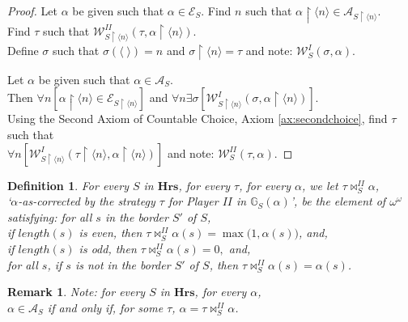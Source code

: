\documentclass[a4paper]{amsart}
\theoremstyle{plain}
\newtheorem{remark}{Remark}
\newtheorem{definition}{Definition}
\begin{document}
\begin{proof}
  Let $\alpha$ be given such that $\alpha \in \mathcal{E}_S$. Find $n$ such that $\alpha\upharpoonright\langle n \rangle \in \mathcal{A}_{S\upharpoonright\langle n \rangle}$. \\Find $\tau$ such that $\mathcal{W}^{II}_{S\upharpoonright\langle n \rangle} (\tau, \alpha\upharpoonright\langle n \rangle)$. \\Define $\sigma$ such that $\sigma(\langle\;\rangle)=n$ and $\sigma\upharpoonright \langle n \rangle =\tau$ and note: $\mathcal{W}^I_S(\sigma, \alpha)$. 
  
  \smallskip Let $\alpha$ be given such that $\alpha \in \mathcal{A}_S$. \\Then $\forall n[\alpha\upharpoonright\langle n \rangle \in \mathcal{E}_{S\upharpoonright\langle n \rangle}]$ and $\forall n\exists \sigma[\mathcal{W}^I_{S\upharpoonright\langle n \rangle}(\sigma, \alpha\upharpoonright\langle n \rangle)]$. 
   \\Using the Second Axiom of Countable Choice, Axiom \ref{ax:secondchoice}, find $\tau$ such that \\$\forall n[\mathcal{W}^I_{S\upharpoonright\langle n\rangle}(\tau\upharpoonright\langle n \rangle, \alpha\upharpoonright\langle n \rangle)]$ and note: $\mathcal{W}^{II}_S(\tau, \alpha)$.  
  \end{proof}
  \begin{definition}\label{D:correctionbystrategies}For every $S$ in $\mathbf{Hrs}$, for every $\tau$, for every $\alpha$, we let $\tau\Join_S^{II}\alpha$, \\\emph{`$\alpha$-as-corrected by the strategy $\tau$ for Player $II$ in $\mathbb{G}_S(\alpha)$'}, be the element of $\omega^\omega $ satisfying:
  for all $s$ in the border $S'$ of $S$, \\if $length(s)$ is even, then $\tau\Join_S^{II}\alpha(s) =\max\bigl(1, \alpha(s)\bigr)$, and, \\if $length(s)$ is odd, then $\tau\Join_S^{II}\alpha(s) =0,$ and, \\for all $s$, if $s$ is not in the border $S'$ of $S$, then $\tau\Join_S^{II}\alpha(s)=\alpha(s)$.\end{definition}
  
  \begin{remark}Note: for every $S$ in $\mathbf{Hrs}$, for every $\alpha$, \\$\alpha \in \mathcal{A}_S$ if and only if, for some $\tau$, $\alpha= \tau\Join^{II}_S\alpha$. \end{remark}
  
\end{document}
